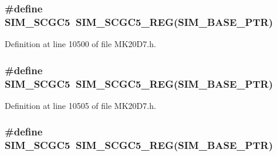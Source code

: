 \subsubsection[{\texorpdfstring{S\+I\+M\+\_\+\+S\+C\+G\+C5}{SIM_SCGC5}}]{\setlength{\rightskip}{0pt plus 5cm}\#define S\+I\+M\+\_\+\+S\+C\+G\+C5~{\bf S\+I\+M\+\_\+\+S\+C\+G\+C5\+\_\+\+R\+EG}({\bf S\+I\+M\+\_\+\+B\+A\+S\+E\+\_\+\+P\+TR})}\hypertarget{group___s_i_m___register___accessor___macros_gaaf818be466b128c6df228950c25e8015}{}\label{group___s_i_m___register___accessor___macros_gaaf818be466b128c6df228950c25e8015}


Definition at line 10500 of file M\+K20\+D7.\+h.

\subsubsection[{\texorpdfstring{S\+I\+M\+\_\+\+S\+C\+G\+C5}{SIM_SCGC5}}]{\setlength{\rightskip}{0pt plus 5cm}\#define S\+I\+M\+\_\+\+S\+C\+G\+C5~{\bf S\+I\+M\+\_\+\+S\+C\+G\+C5\+\_\+\+R\+EG}({\bf S\+I\+M\+\_\+\+B\+A\+S\+E\+\_\+\+P\+TR})}\hypertarget{group___s_i_m___register___accessor___macros_gaaf818be466b128c6df228950c25e8015}{}\label{group___s_i_m___register___accessor___macros_gaaf818be466b128c6df228950c25e8015}


Definition at line 10505 of file M\+K20\+D7.\+h.

\subsubsection[{\texorpdfstring{S\+I\+M\+\_\+\+S\+C\+G\+C5}{SIM_SCGC5}}]{\setlength{\rightskip}{0pt plus 5cm}\#define S\+I\+M\+\_\+\+S\+C\+G\+C5~{\bf S\+I\+M\+\_\+\+S\+C\+G\+C5\+\_\+\+R\+EG}({\bf S\+I\+M\+\_\+\+B\+A\+S\+E\+\_\+\+P\+TR})}\hypertarget{group___s_i_m___register___accessor___macros_gaaf818be466b128c6df228950c25e8015}{}\label{group___s_i_m___register___accessor___macros_gaaf818be466b128c6df228950c25e8015}


